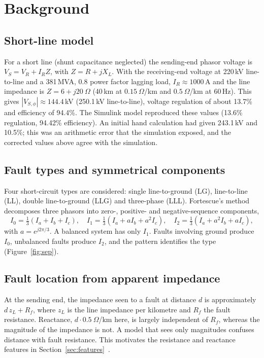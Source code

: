 \documentclass[11pt,a4paper]{article}
\begin{document}
\section{Background}
\subsection{Short-line model}
For a short line (shunt capacitance neglected) the sending-end phasor voltage is $V_S = V_R + I_R Z$, with $Z = R + jX_L$. With the receiving-end voltage at 220\,kV line-to-line and a 381\,MVA, 0.8 power factor lagging load, $I_R \approx 1000$\,A and the line impedance is $Z = 6 + j20\ \Omega$ (40\,km at $0.15\ \Omega$/km and $0.5\ \Omega$/km at 60\,Hz). This gives $|V_{S,\phi}| \approx 144.4$\,kV (250.1\,kV line-to-line), voltage regulation of about 13.7\% and efficiency of 94.4\%. The Simulink model reproduced these values (13.6\% regulation, 94.42\% efficiency). An initial hand calculation had given 243.1\,kV and 10.5\%; this was an arithmetic error that the simulation exposed, and the corrected values above agree with the simulation.

\subsection{Fault types and symmetrical components}
Four short-circuit types are considered: single line-to-ground (LG), line-to-line (LL), double line-to-ground (LLG) and three-phase (LLL). Fortescue's method~\cite{fortescue1918} decomposes three phasors into zero-, positive- and negative-sequence components,
\begin{equation}
 I_0 = \tfrac{1}{3}(I_a+I_b+I_c),\quad I_1 = \tfrac{1}{3}(I_a+aI_b+a^2I_c),\quad I_2 = \tfrac{1}{3}(I_a+a^2I_b+aI_c),
\end{equation}
with $a = e^{j2\pi/3}$. A balanced system has only $I_1$. Faults involving ground produce $I_0$, unbalanced faults produce $I_2$, and the pattern identifies the type (Figure~\ref{fig:sep}).

\subsection{Fault location from apparent impedance}\label{sec:locbg}
At the sending end, the impedance seen to a fault at distance $d$ is approximately $d\,z_L + R_f$, where $z_L$ is the line impedance per kilometre and $R_f$ the fault resistance. Reactance, $d \cdot 0.5\ \Omega$/km here, is largely independent of $R_f$, whereas the magnitude of the impedance is not. A model that sees only magnitudes confuses distance with fault resistance. This motivates the resistance and reactance features in Section~\ref{sec:features}~\cite{saha2010}.
\end{document}
